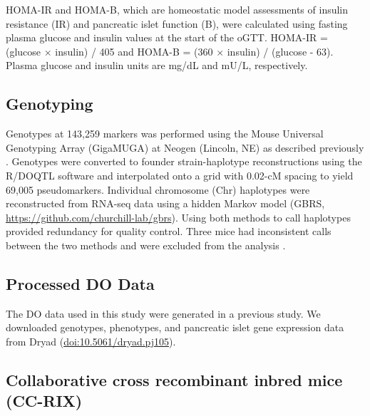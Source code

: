 \documentclass[
]{article}
\begin{document}
HOMA-IR and HOMA-B, which are homeostatic model assessments of insulin
resistance (IR) and pancreatic islet function (B), were calculated using
fasting plasma glucose and insulin values at the start of the oGTT.
HOMA-IR = (glucose \(\times\) insulin) / 405 and HOMA-B = (360
\(\times\) insulin) / (glucose - 63). Plasma glucose and insulin units
are mg/dL and mU/L, respectively.

\subsection{Genotyping}\label{genotyping}

Genotypes at 143,259 markers was performed using the Mouse Universal
Genotyping Array (GigaMUGA) \cite{pmid26684931} at Neogen (Lincoln, NE)
as described previously \cite{pmid29567659, pmid22345611}. Genotypes
were converted to founder strain-haplotype reconstructions using the
R/DOQTL software \cite{pmid25237114} and interpolated onto a grid with
0.02-cM spacing to yield 69,005 pseudomarkers. Individual chromosome
(Chr) haplotypes were reconstructed from RNA-seq data using a hidden
Markov model \cite{choi2020genotype} (GBRS,
\url{https://github.com/churchill-lab/gbrs}). Using both methods to call
haplotypes provided redundancy for quality control. Three mice had
inconsistent calls between the two methods and were excluded from the
analysis \cite{pmid29567659}.

\subsection{Processed DO Data}\label{processed-do-data}

The DO data used in this study were generated in a previous
study\cite{pmid31343992, pmid29567659}. We downloaded genotypes,
phenotypes, and pancreatic islet gene expression data from Dryad
(\url{doi:10.5061/dryad.pj105}).

\subsection{Collaborative cross recombinant inbred mice
(CC-RIX)}\label{collaborative-cross-recombinant-inbred-mice-cc-rix}
\end{document}

